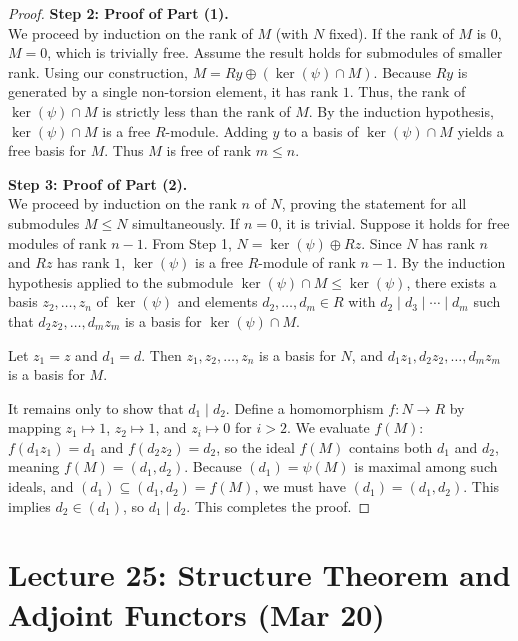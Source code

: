 \documentclass[a4paper,12pt]{article}
\begin{document}
\begin{proof}
    \textbf{Step 2: Proof of Part (1).}\\
    We proceed by induction on the rank of $M$ (with $N$ fixed). If the rank of $M$ is $0$, $M = 0$, which is trivially free. Assume the result holds for submodules of smaller rank. Using our construction, $M = Ry \oplus (\ker(\psi) \cap M)$. Because $Ry$ is generated by a single non-torsion element, it has rank $1$. Thus, the rank of $\ker(\psi) \cap M$ is strictly less than the rank of $M$. By the induction hypothesis, $\ker(\psi) \cap M$ is a free $R$-module. Adding $y$ to a basis of $\ker(\psi) \cap M$ yields a free basis for $M$. Thus $M$ is free of rank $m \leq n$.

    \textbf{Step 3: Proof of Part (2).}\\
    We proceed by induction on the rank $n$ of $N$, proving the statement for all submodules $M \leq N$ simultaneously. If $n=0$, it is trivial. Suppose it holds for free modules of rank $n-1$. From Step 1, $N = \ker(\psi) \oplus Rz$. Since $N$ has rank $n$ and $Rz$ has rank $1$, $\ker(\psi)$ is a free $R$-module of rank $n-1$. By the induction hypothesis applied to the submodule $\ker(\psi) \cap M \leq \ker(\psi)$, there exists a basis $z_2, \dots, z_n$ of $\ker(\psi)$ and elements $d_2, \dots, d_m \in R$ with $d_2 \mid d_3 \mid \cdots \mid d_m$ such that $d_2 z_2, \dots, d_m z_m$ is a basis for $\ker(\psi) \cap M$.

    Let $z_1 = z$ and $d_1 = d$. Then $z_1, z_2, \dots, z_n$ is a basis for $N$, and $d_1 z_1, d_2 z_2, \dots, d_m z_m$ is a basis for $M$. 
    
    It remains only to show that $d_1 \mid d_2$. Define a homomorphism $f: N \to R$ by mapping $z_1 \mapsto 1$, $z_2 \mapsto 1$, and $z_i \mapsto 0$ for $i > 2$. We evaluate $f(M)$: $f(d_1 z_1) = d_1$ and $f(d_2 z_2) = d_2$, so the ideal $f(M)$ contains both $d_1$ and $d_2$, meaning $f(M) = (d_1, d_2)$. Because $(d_1) = \psi(M)$ is maximal among such ideals, and $(d_1) \subseteq (d_1, d_2) = f(M)$, we must have $(d_1) = (d_1, d_2)$. This implies $d_2 \in (d_1)$, so $d_1 \mid d_2$. This completes the proof.
\end{proof}
\newpage
\section{Lecture 25: Structure Theorem and Adjoint Functors (Mar 20)}
\end{document}
